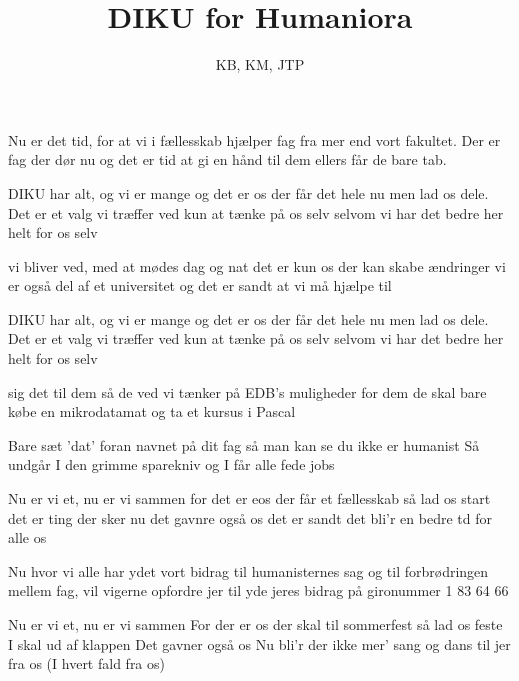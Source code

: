\documentclass[a4paper,11pt]{article}
\title{DIKU for Humaniora}
\author{KB, KM, JTP}
\begin{document}
\maketitle

\begin{song}
Nu er det tid, for at vi i fællesskab
hjælper fag fra mer end vort fakultet.
Der er fag der dør nu
og det er tid at gi en hånd
til dem ellers får de bare tab.

DIKU har alt, og vi er mange
og det er os der får det hele nu
men lad os dele.
Det er et valg vi træffer 
ved kun at tænke på os selv
selvom vi har det bedre her
helt for os selv

vi bliver ved, med at mødes dag og nat
det er kun os der kan skabe ændringer
vi er også del af et universitet
og det er sandt at vi må hjælpe til

DIKU har alt, og vi er mange
og det er os der får det hele nu
men lad os dele.
Det er et valg vi træffer 
ved kun at tænke på os selv
selvom vi har det bedre her
helt for os selv

sig det til dem så de ved vi tænker på
EDB's muligheder for dem
de skal bare købe en mikrodatamat
og ta et kursus i Pascal

Bare sæt 'dat' foran navnet på dit fag
så man kan se du ikke er humanist
Så undgår I den grimme sparekniv
og I får alle fede jobs

Nu er vi et, nu er vi sammen
for det er eos der får et fællesskab
så lad os start
det er ting der sker nu
det gavnre også os
det er sandt det bli'r en bedre td
for alle os
\end{song}

\begin{sketch}
 Nu hvor vi alle har ydet vort bidrag til humanisternes sag og til
forbrødringen mellem fag, vil vigerne opfordre jer til yde jeres bidrag på
gironummer 1 83 64 66
\end{sketch}

\begin{song}
Nu er vi et, nu er vi sammen
For der er os der skal til sommerfest
så lad os feste
I skal ud af klappen
Det gavner også os
Nu bli'r der ikke mer' sang og dans
til jer fra os (I hvert fald fra os)
\end{song}
\end{document}
